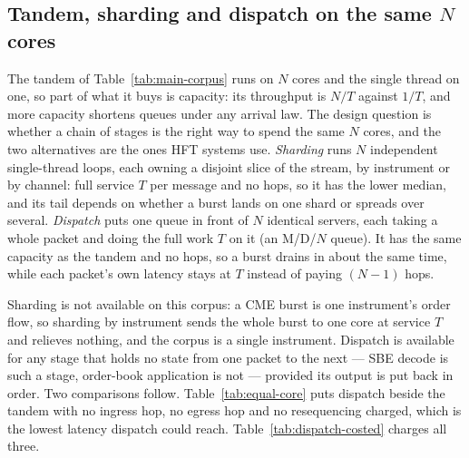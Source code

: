 \documentclass[11pt]{article}
\begin{document}
\subsection{Tandem, sharding and dispatch on the same $N$ cores}
\label{sec:results-equal-core}

The tandem of Table~\ref{tab:main-corpus} runs on $N$ cores and the single thread on
one, so part of what it buys is capacity: its throughput is $N/T$ against $1/T$, and more
capacity shortens queues under any arrival law. The design question is whether a chain
of stages is the right way to spend the same $N$ cores, and the two alternatives are the
ones HFT systems use. \emph{Sharding} runs $N$ independent single-thread loops,
each owning a disjoint slice of the stream, by instrument or by channel: full service $T$
per message and no hops, so it has the lower median, and its tail depends on whether
a burst lands on one shard or spreads over several. \emph{Dispatch} puts one queue in front of $N$ identical servers, each taking a
whole packet and doing the full work $T$ on it (an M/D/$N$ queue). It has the same
capacity as the tandem and no hops, so a burst drains in about the same time, while each
packet's own latency stays at $T$ instead of paying $(N-1)$ hops.

Sharding is not available on this corpus: a CME burst is one instrument's order flow, so
sharding by instrument sends the whole burst to one core at service $T$ and relieves
nothing, and the corpus is a single instrument. Dispatch is available for any stage that
holds no state from one packet to the next --- SBE decode is such a stage, order-book
application is not --- provided its output is put back in order. Two comparisons follow.
Table~\ref{tab:equal-core} puts dispatch beside the tandem with no ingress hop, no egress
hop and no resequencing charged, which is the lowest latency dispatch could reach.
Table~\ref{tab:dispatch-costed} charges all three.
\end{document}
